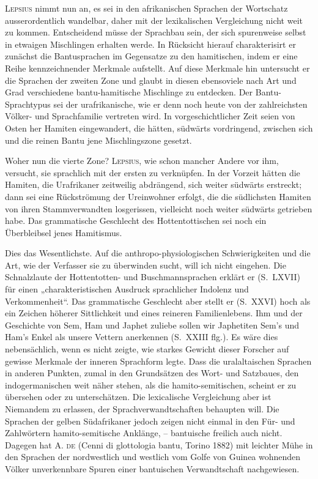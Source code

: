 {\label{fp.276}

\textsc{Lepsius} nimmt nun an, es sei in den afrikanischen Sprachen der Wortschatz  ausserordentlich wandelbar, daher mit der lexikalischen Vergleichung nicht weit zu kommen. Entscheidend müsse der Sprachbau sein, der sich spurenweise selbst in etwaigen Mischlingen erhalten werde. In Rücksicht hierauf charakterisirt er zunächst die Bantusprachen im Gegensatze zu den hamitischen, indem er eine Reihe kennzeichnender Merkmale aufstellt. Auf diese Merkmale hin untersucht er die Sprachen der zweiten Zone und glaubt in diesen ebensoviele nach Art und Grad verschiedene bantu-hamitische Mischlinge zu entdecken. Der Bantu-Sprachtypus sei der urafrikanische, wie er denn noch heute von der zahlreichsten Völker- und Sprachfamilie vertreten wird. In vorgeschichtlicher Zeit seien von Osten her Hamiten eingewandert, die hätten, südwärts vordringend, zwischen sich und die reinen Bantu jene Mischlingszone gesetzt.

Woher nun die vierte Zone? \textsc{Lepsius}, wie schon mancher Andere vor ihm, versucht, sie sprachlich mit der ersten zu verknüpfen. In der Vorzeit hätten die Hamiten, die Urafrikaner zeitweilig abdrängend, sich weiter südwärts erstreckt; dann sei eine Rückströmung der Ureinwohner erfolgt, die die südlichsten Hamiten von ihren Stammverwandten losgerissen, vielleicht noch weiter südwärts getrieben habe. Das grammatische Geschlecht des Hottentottischen sei noch ein Überbleibsel jenes Hamitismus.

Dies das Wesentlichste. Auf die anthropo-physiologischen Schwierigkeiten und die Art, wie der Verfasser sie zu überwinden sucht, will ich nicht eingehen. Die Schnalzlaute der Hottentotten- und Buschmannsprachen erklärt er (S.~LXVII) für einen „charakteristischen Ausdruck sprachlicher Indolenz und Verkommenheit“. Das grammatische Geschlecht aber stellt er (S.~XXVI) hoch \label{sp.283} als ein Zeichen höherer Sittlichkeit und eines reineren Familienlebens. Ihm und der Geschichte von Sem, Ham und Japhet zuliebe sollen wir Japhetiten Sem’s und Ham’s Enkel als unsere Vettern anerkennen (S.~XXIII flg.). Es wäre dies nebensächlich, wenn es nicht zeigte, wie starkes Gewicht dieser Forscher auf gewisse Merkmale der inneren Sprachform legte. Dass die uralaltaischen Sprachen in anderen Punkten, zumal in den Grundsätzen des Wort- und Satzbaues, den indogermanischen weit näher stehen, als die hamito-semitischen, scheint er zu übersehen oder zu unterschätzen. Die lexicalische Vergleichung aber ist Niemandem zu erlassen, der Sprachverwandtschaften \label{fp.277} behaupten will. Die Sprachen der gelben Südafrikaner jedoch zeigen nicht einmal in den Für- und Zahlwörtern hamito-semitische Anklänge, – bantuische freilich auch nicht. Dagegen hat \textsc{A. de } (Cenni di glottologia bantu, Torino 1882) mit leichter Mühe in den Sprachen der nordwestlich und westlich vom Golfe von Guinea wohnenden Völker unverkennbare Spuren einer bantuischen Verwandtschaft nachgewiesen.

}
